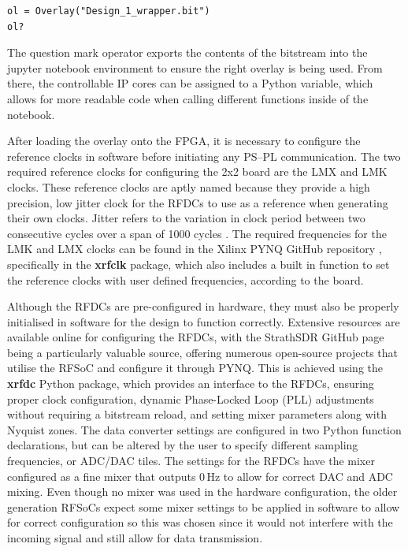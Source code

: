 \documentclass[12pt, a4paper]{article}
\begin{document}
\begin{listing}[H]
\begin{verbatim}
ol = Overlay("Design_1_wrapper.bit")
ol? 
\end{verbatim}
\caption{Python Code for Inspecting Overlay Content}
\label{list:overlay_content}
\end{listing}

The question mark operator exports the contents of the bitstream into the jupyter notebook environment to ensure the right overlay is being used. From there, the controllable IP cores can be assigned to a Python variable, which allows for more readable code when calling different functions inside of the notebook.

After loading the overlay onto the FPGA, it is necessary to configure the reference clocks in software before initiating any PS–PL communication. The two required reference clocks for configuring the 2x2 board are the LMX and LMK clocks. These reference clocks are aptly named because they provide a high precision, low jitter clock for the RFDCs to use as a reference when generating their own clocks. Jitter refers to the variation in clock period between two consecutive cycles over a span of 1000 cycles \cite{jitter}. The required frequencies for the LMK and LMX clocks can be found in the  Xilinx PYNQ GitHub repository \cite{pynq_github}, specifically in the \textbf{xrfclk} package, which also includes a built in function to set the reference clocks with user defined frequencies, according to the board.

Although the RFDCs are pre-configured in hardware, they must also be properly initialised in software for the design to function correctly. Extensive resources are available online for configuring the RFDCs, with the StrathSDR GitHub page being a particularly valuable source, offering numerous open-source projects that utilise the RFSoC and configure it through PYNQ. This is achieved using the \textbf{xrfdc} Python package, which provides an interface to the RFDCs, ensuring proper clock configuration, dynamic Phase-Locked Loop (PLL) adjustments without requiring a bitstream reload, and setting mixer parameters along with Nyquist zones. The data converter settings are configured in two Python function declarations, but can be altered by the user to specify different sampling frequencies, or ADC/DAC tiles. The settings for the RFDCs have the mixer configured as a fine mixer that outputs 0\,Hz to allow for correct DAC and ADC mixing. Even though no mixer was used in the hardware configuration, the older generation RFSoCs expect some mixer settings to be applied in software to allow for correct configuration so this was chosen since it would not interfere with the incoming signal and still allow for data transmission.
\end{document}
